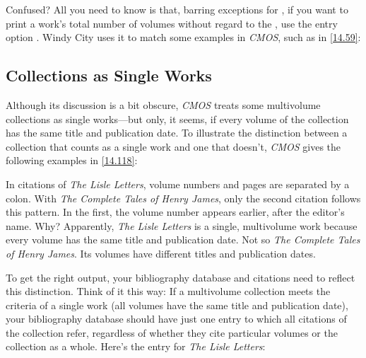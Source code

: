 \documentclass[11pt,letterpaper,oneside]{article}
\begin{document}
Confused? All you need to know is that, barring exceptions for
, if you want to print a work's total number of volumes
without regard to the , use the entry option
. Windy City uses it to match some examples in
\textit{CMOS}, such as in \ref{14.59}:

\begin{citeonly}
\item \cite[1:126]{shurtleff1853}
\end{citeonly}

\subsection{Collections as Single Works}
\label{multivolume}

Although its discussion is a bit obscure, \textit{CMOS} treats some
multivolume collections as single works---but only, it seems, if every
volume of the collection has the same title and publication date. To
illustrate the distinction between a collection that counts as a
single work and one that doesn't, \textit{CMOS} gives the following
examples in \ref{14.118}:

\begin{citeonly}
\item \cite[4:243]{byrne1981}
\item \cite*[32--33]{james1963.5}
\item \cite[4:245]{byrne1981}
\item \cite*[34]{james1963.5}
\end{citeonly}

In citations of \textit{The Lisle Letters}, volume numbers and pages
are separated by a colon. With \textit{The Complete Tales of Henry
James}, only the second citation follows this pattern. In the first,
the volume number appears earlier, after the editor's name. Why?
Apparently, \textit{The Lisle Letters} is a single, multivolume work
because every volume has the same title and publication date. Not so
\textit{The Complete Tales of Henry James}. Its volumes have different
titles and publication dates.

To get the right output, your bibliography database and citations need
to reflect this distinction. Think of it this way: If a multivolume
collection meets the criteria of a single work (all volumes have the
same title and publication date), your bibliography database should
have just one entry to which all citations of the collection refer,
regardless of whether they cite particular volumes or the collection
as a whole. Here's the entry for \textit{The Lisle Letters}:
\end{document}
